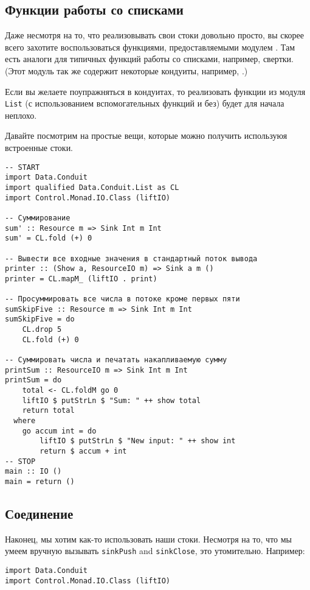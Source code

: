 {\subsection{Функции работы со списками}
Даже несмотря на то, что реализовывать свои стоки довольно просто, вы скорее всего захотите воспользоваться функциями, предоставляемыми модулем
. Там есть аналоги для типичных функций работы со
списками, например, свертки. (Этот модуль так же содержит некоторые кондуиты,
например, 
.)

Если вы желаете поупражняться в кондуитах, то реализовать функции из модуля 
\lstinline'List' (с использованием вспомогательных функций и без) будет для начала неплохо.

Давайте посмотрим на простые вещи, которые можно получить используюя встроенные стоки.
\begin{lstlisting}
-- START
import Data.Conduit
import qualified Data.Conduit.List as CL
import Control.Monad.IO.Class (liftIO)

-- Суммирование
sum' :: Resource m => Sink Int m Int
sum' = CL.fold (+) 0

-- Вывести все входные значения в стандартный поток вывода
printer :: (Show a, ResourceIO m) => Sink a m ()
printer = CL.mapM_ (liftIO . print)

-- Просуммировать все числа в потоке кроме первых пяти
sumSkipFive :: Resource m => Sink Int m Int
sumSkipFive = do
    CL.drop 5
    CL.fold (+) 0

-- Суммировать числа и печатать накапливаемую сумму
printSum :: ResourceIO m => Sink Int m Int
printSum = do
    total <- CL.foldM go 0
    liftIO $ putStrLn $ "Sum: " ++ show total
    return total
  where
    go accum int = do
        liftIO $ putStrLn $ "New input: " ++ show int
        return $ accum + int
-- STOP
main :: IO ()
main = return ()
\end{lstlisting}

\subsection{Соединение}
Наконец, мы хотим как-то использовать наши стоки. Несмотря на то, что мы умеем вручную вызывать
\verb*|sinkPush| and \verb*|sinkClose|, это утомительно. Например:
\begin{lstlisting}
import Data.Conduit
import Control.Monad.IO.Class (liftIO)


\end{lstlisting}}
